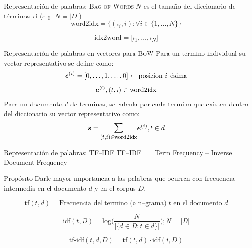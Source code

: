 \documentclass[10pt]{beamer}
\begin{document}
\begin{frame}{Representación de palabras: \textsc{Bag of Words}}
  $N$ es el tamaño del diccionario de términos $D$ (e.g. $N = |D|$).
  \begin{equation*} \label{eq:bow-repr1}
    \text{word2idx} = \Big\{(t_i, i) : \forall i \in \{1, \ldots, N\} \Big\}
  \end{equation*}
  
  \begin{equation*} \label{eq:bow-repr2}
    \text{idx2word} = \Big[t_1, \ldots, t_N\Big]
  \end{equation*}

  \begin{alertblock}{Representación de palabras en vectores para \textsc{BoW}}
    Para un termino individual su vector representativo se define como:
    \begin{equation*}
      {\bm{e}}^{(i)} = [0, \ldots, 1, \ldots, 0] \leftarrow \text{posicion } i\text{--\'esima}
    \end{equation*}
    \begin{equation*}
      {\bm{e}}^{(i)}, (t, i) \in \text{word2idx}
    \end{equation*}
    Para un documento $d$ de términos, se calcula por cada termino que existen dentro del diccionario su vector representativo como:
    \begin{equation*} \label{eq:bow-word-vector-sum}
      \vs = \mathlarger{\mathlarger{\sum}}_{(t, i) \in \text{word2idx}} \ve^{(i)}, t \in d
    \end{equation*}
  \end{alertblock}
\end{frame}

\begin{frame}{Representación de palabras: \textsc{TF--IDF}}
  \textsc{TF--IDF} $=$ Term Frequency -- Inverse Document Frequency
  \begin{alertblock}{Propósito}
    Darle mayor importancia a las palabras que ocurren con frecuencia intermedia en el documento $d$ y en el corpus $D$.
  \end{alertblock}
  \begin{equation*} \label{eq:tf-repr}
    \text{tf}(t,d) = \text{Frecuencia del termino (o n--grama) } t \text{ en el documento } d
  \end{equation*}

  \begin{equation*} \label{eq:idf-repr}
    \text{idf}(t, D) = \text{log}\Bigg( \frac{N}{|\{d \in D : t \in d\}|} \Bigg) ; N = |D|
  \end{equation*}

  \begin{equation*} \label{eq:tfidf-repr}
    \text{tf-idf}(t, d, D) = \text{tf}(t, d) \cdot \text{idf}(t, D)
  \end{equation*}
\end{frame}
\end{document}
